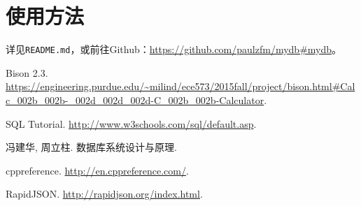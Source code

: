\documentclass[11pt, a4paper]{article}
\begin{document}
\section{使用方法}

详见\texttt{README.md}，或前往Github：\url{https://github.com/paulzfm/mydb#mydb}。



\begin{thebibliography}{9}

 Bison 2.3. \url{https://engineering.purdue.edu/~milind/ece573/2015fall/project/bison.html#Calc_002b_002b-_002d_002d_002d-C_002b_002b-Calculator}.

 SQL Tutorial. \url{http://www.w3schools.com/sql/default.asp}.

 冯建华, 周立柱. 数据库系统设计与原理. 

 cppreference. \url{http://en.cppreference.com/}.

 RapidJSON. \url{http://rapidjson.org/index.html}.

\end{thebibliography}
\end{document}
